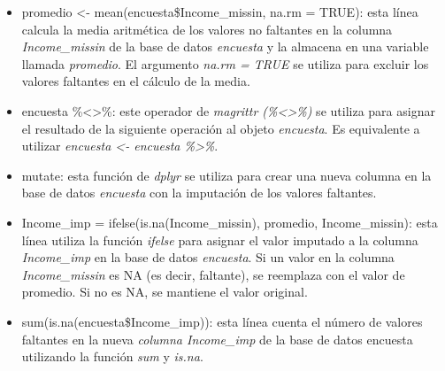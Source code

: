 \documentclass[
  spanish,
  12pt,
]{book}
\begin{document}
\begin{itemize}
\item
  promedio \textless- mean(encuesta\$Income\_missin, na.rm = TRUE): esta línea calcula la media aritmética de los valores no faltantes en la columna \emph{Income\_missin} de la base de datos \emph{encuesta} y la almacena en una variable llamada \emph{promedio}. El argumento \emph{na.rm = TRUE} se utiliza para excluir los valores faltantes en el cálculo de la media.
\item
  encuesta \%\textless\textgreater\%: este operador de \emph{magrittr (\%\textless\textgreater\%)} se utiliza para asignar el resultado de la siguiente operación al objeto \emph{encuesta}. Es equivalente a utilizar \emph{encuesta \textless- encuesta \%\textgreater\%}.
\item
  mutate: esta función de \emph{dplyr} se utiliza para crear una nueva columna en la base de datos \emph{encuesta} con la imputación de los valores faltantes.
\item
  Income\_imp = ifelse(is.na(Income\_missin), promedio, Income\_missin): esta línea utiliza la función \emph{ifelse} para asignar el valor imputado a la columna \emph{Income\_imp} en la base de datos \emph{encuesta}. Si un valor en la columna \emph{Income\_missin} es NA (es decir, faltante), se reemplaza con el valor de promedio. Si no es NA, se mantiene el valor original.
\item
  sum(is.na(encuesta\$Income\_imp)): esta línea cuenta el número de valores faltantes en la nueva \emph{columna Income\_imp} de la base de datos encuesta utilizando la función \emph{sum} y \emph{is.na}.
\end{itemize}
\end{document}
